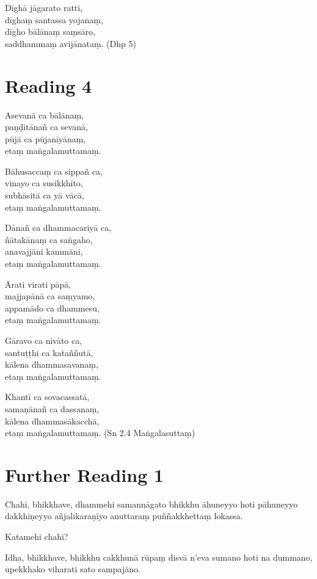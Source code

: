 Dīghā jāgarato ratti,\\
dīghaṃ santassa yojanaṃ,\\
dīgho bālānaṃ saṃsāro,\\
saddhammaṃ avijānataṃ. \hfill(Dhp 5)

\section*{Reading 4}

Asevanā ca bālānaṃ,\\
paṇḍitānañ ca sevanā,\\
pūjā ca pūjanīyānaṃ,\\
etaṃ maṅgalamuttamaṃ.

Bāhusaccaṃ ca sippañ ca,\\
vinayo ca susikkhito,\\
subhāsitā ca yā vācā,\\
etaṃ maṅgalamuttamaṃ.

Dānañ ca dhammacariyā ca,\\
ñātakānaṃ ca saṅgaho,\\
anavajjāni kammāni,\\
etaṃ maṅgalamuttamaṃ.

Ārati virati pāpā,\\
majjapānā ca saṃyamo,\\
appamādo ca dhammesu,\\
etaṃ maṅgalamuttamaṃ.

Gāravo ca nivāto ca,\\
santuṭṭhi ca kataññutā,\\
kālena dhammasavanaṃ,\\
etaṃ maṅgalamuttamaṃ.

Khantī ca sovacassatā,\\
samaṇānañ ca dassanaṃ,\\
kālena dhammasākacchā,\\
etaṃ maṅgalamuttamaṃ. \hfill(Sn 2.4 Maṅgalasuttaṃ)

\section*{Further Reading 1}

Chahi, bhikkhave, dhammehi samannāgato bhikkhu āhuneyyo hoti pāhuneyyo dakkhiṇeyyo añjalikaraṇīyo anuttaraṃ puññakkhettaṃ lokassa.

Katamehi chahi?

Idha, bhikkhave, bhikkhu cakkhunā rūpaṃ disvā n’eva sumano hoti na dummano, upekkhako viharati sato sampajāno.

